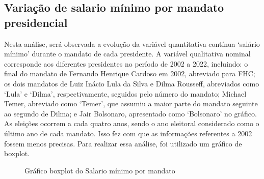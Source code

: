 \documentclass[
]{estat/estat}
\begin{document}
\subsection{Variação de salario mínimo por mandato
presidencial}\label{variauxe7uxe3o-de-salario-muxednimo-por-mandato-presidencial}

Nesta análise, será observada a evolução da variável quantitativa
contínua `salário mínimo' durante o mandato de cada presidente. A
variável qualitativa nominal corresponde aos diferentes presidentes no
período de 2002 a 2022, incluindo: o final do mandato de Fernando
Henrique Cardoso em 2002, abreviado para FHC; os dois mandatos de Luiz
Inácio Lula da Silva e Dilma Rousseff, abreviados como `Lula' e `Dilma',
respectivamente, seguidos pelo número do mandato; Michael Temer,
abreviado como `Temer', que assumiu a maior parte do mandato seguinte ao
segundo de Dilma; e Jair Bolsonaro, apresentado como `Bolsonaro' no
gráfico. As eleições ocorrem a cada quatro anos, sendo o ano eleitoral
considerado como o último ano de cada mandato. Isso fez com que as
informações referentes a 2002 fossem menos precisas. Para realizar essa
análise, foi utilizado um gráfico de boxplot.

\begin{figure}[H]

\caption{\label{fig-graf3}Gráfico boxplot do Salario mínimo por mandato}


\end{figure}%
\end{document}
